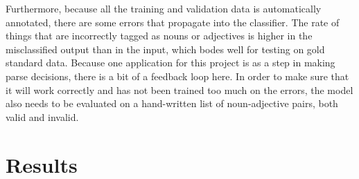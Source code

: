 \documentclass{article}
\begin{document}
Furthermore, because all the training and validation data is automatically annotated, there are some errors that propagate into the classifier. The rate of things that are incorrectly tagged as nouns or adjectives is higher in the misclassified output than in the input, which bodes well for testing on gold standard data. Because one application for this project is as a step in making parse decisions, there is a bit of a feedback loop here. In order to make sure that it will work correctly and has not been trained too much on the errors, the model also needs to be evaluated on a hand-written list of noun-adjective pairs, both valid and invalid.


\section{Results}
\end{document}
